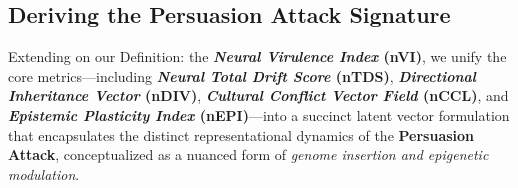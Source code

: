 

\subsection*{\textbf{Deriving the Persuasion Attack Signature}}

Extending on our Definition: the \textbf{\textit{Neural Virulence Index} (nVI)}, we unify the core metrics—including \textbf{\textit{Neural Total Drift Score} (nTDS)}, \textbf{\textit{Directional Inheritance Vector} (nDIV)}, \textbf{\textit{Cultural Conflict Vector Field} (nCCL)}, and \textbf{\textit{Epistemic Plasticity Index} (nEPI)}—into a succinct latent vector formulation that encapsulates the distinct representational dynamics of the \textbf{Persuasion Attack}, conceptualized as a nuanced form of \emph{genome insertion and epigenetic modulation}.






